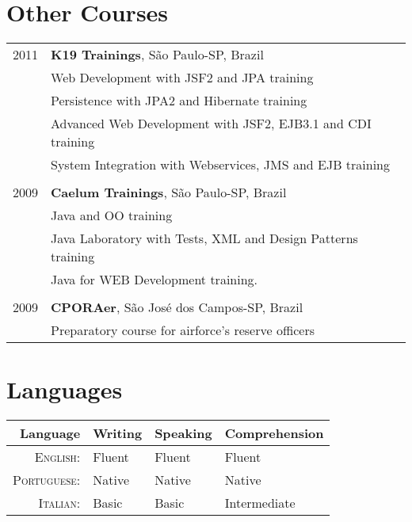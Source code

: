 \documentclass[a4paper,10pt]{article} %
\begin{document}
\section{Other Courses}

\begin{tabular}{r|p{11cm}}
2011 & \textbf{K19 Trainings}, S\~ao Paulo-SP, Brazil\\
    & \footnotesize{Web Development with JSF2 and JPA} training\\
    & \footnotesize{Persistence with JPA2 and Hibernate} training\\
    & \footnotesize{Advanced Web Development with JSF2, EJB3.1 and CDI} training\\
    & \footnotesize{System Integration with Webservices, JMS and EJB} training\\
    \multicolumn{2}{c}{}\\
    
2009 & \textbf{Caelum Trainings}, S\~{a}o Paulo-SP, Brazil\\
    & \footnotesize{Java and OO} training\\
    & \footnotesize{Java Laboratory with Tests, XML and Design Patterns} training\\
    & \footnotesize{Java for WEB Development} training.\\
    \multicolumn{2}{c}{}\\

2009 & \textbf{CPORAer}, São José dos Campos-SP, Brazil\\
    & \footnotesize{Preparatory course for airforce's reserve officers}\\

\end{tabular}


\section{Languages}

\begin{tabular}{r|lll}
Language &  Writing & Speaking & Comprehension \\
\hline
\textsc{English:} & Fluent & Fluent & Fluent \\ 

\textsc{Portuguese:} & Native & Native & Native \\

\textsc{Italian:} & Basic & Basic & Intermediate\\
\end{tabular}
\end{document}
